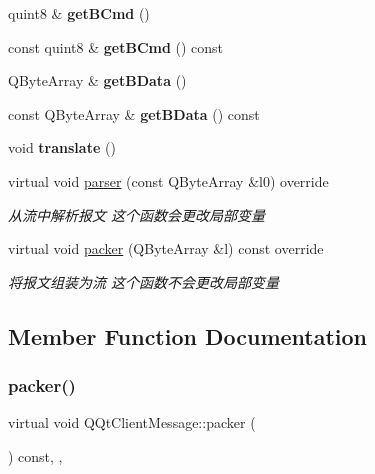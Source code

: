 \begin{DoxyCompactItemize}
quint8 \& {\bfseries get\+B\+Cmd} ()
\item 
\mbox{\label{class_q_qt_client_message_a5093c3eea7ac237a77a20a6cc4985133}} 
const quint8 \& {\bfseries get\+B\+Cmd} () const
\item 
\mbox{\label{class_q_qt_client_message_ada5fae11ca1f21a491a47d923bbb4c95}} 
Q\+Byte\+Array \& {\bfseries get\+B\+Data} ()
\item 
\mbox{\label{class_q_qt_client_message_afa5ddb482dc0be86698da615027438c5}} 
const Q\+Byte\+Array \& {\bfseries get\+B\+Data} () const
\item 
\mbox{\label{class_q_qt_client_message_a2354cd422e0db4d4319aa316fde73646}} 
void {\bfseries translate} ()
\item 
virtual void \mbox{\hyperlink{class_q_qt_client_message_a79064773c134b5a0fba051b7b3f8c130}{parser}} (const Q\+Byte\+Array \&l0) override
\begin{DoxyCompactList}\small\item\em 从流中解析报文 这个函数会更改局部变量 \end{DoxyCompactList}\item 
virtual void \mbox{\hyperlink{class_q_qt_client_message_afb9c1787e0bc4927111bc989e96adaa5}{packer}} (Q\+Byte\+Array \&l) const override
\begin{DoxyCompactList}\small\item\em 将报文组装为流 这个函数不会更改局部变量 \end{DoxyCompactList}\end{DoxyCompactItemize}


\subsection{Member Function Documentation}
\mbox{\label{class_q_qt_client_message_afb9c1787e0bc4927111bc989e96adaa5}} 
\subsubsection{\texorpdfstring{packer()}{packer()}}
{\footnotesize\ttfamily virtual void Q\+Qt\+Client\+Message\+::packer (\begin{DoxyParamCaption}\item[{Q\+Byte\+Array \&}]{ }\end{DoxyParamCaption}) const\hspace{0.3cm}{\ttfamily [inline]}, {\ttfamily [override]}, {\ttfamily [virtual]}}



